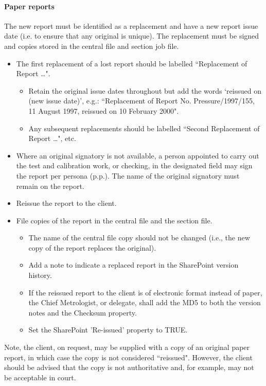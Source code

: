 \paragraph{Paper reports}
The new report must be identified as a replacement and have a new report issue date (i.e. to ensure that any original is unique). The replacement must be signed and copies stored in the central file and section job file. 
\begin{itemize}
\item The first replacement of a lost report should be labelled ``Replacement of Report \ldots". 
\begin{itemize}
\item Retain the original issue dates throughout but add the words `reissued on (new issue date)', e.g.: ``Replacement of Report No. Pressure/1997/155, 11 August 1997, reissued on 10 February 2000".
\item Any subsequent replacements should be labelled ``Second Replacement of Report \ldots", etc.
\end{itemize}

\item Where an original signatory is not available, a person appointed to carry out the test and calibration work, or checking, in the designated field may sign the report per persona (p.p.).  The name of the original signatory must remain on the report.

\item Reissue the report to the client.

\item File copies of the report in the central file and the section file.
\begin{itemize}
\item The name of the central file copy should not be changed (i.e., the new copy of the report replaces the original). 
\item Add a note to indicate a replaced report in the SharePoint version history.
\item If the reissued report to the client is of electronic format instead of paper, the Chief Metrologist, or delegate, shall add the MD5 to both the version notes and the Checksum property.
\item Set the SharePoint 'Re-issued' property to TRUE.
\end{itemize}
\end{itemize}

Note, the client, on request, may be supplied with a copy of an original paper report, in which case the copy is not considered ``reissued". However, the client should be advised that the copy is not authoritative and, for example, may not be acceptable in court.

